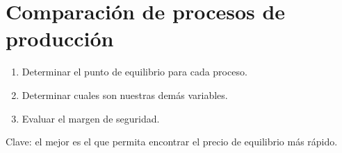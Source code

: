 
\section{Comparación de procesos de producción}
\begin{enumerate}
    \item Determinar el punto de equilibrio para cada proceso.
    \item Determinar cuales son nuestras demás variables.
    \item Evaluar el margen de seguridad.
\end{enumerate}
Clave: el mejor es el que permita encontrar el precio de equilibrio más rápido.
